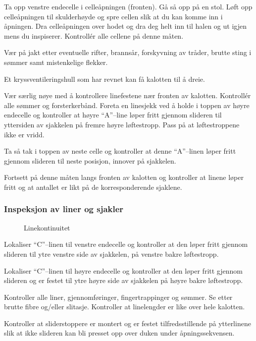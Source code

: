 Ta opp venstre endecelle i celleåpningen (fronten). Gå så opp på en stol. Løft opp celleåpningen til skulderhøyde og spre cellen slik at du kan komme inn i åpningen. Dra celleåpningen over hodet og dra deg helt inn til halen og ut igjen mens du inspiserer. Kontrollér alle cellene på denne måten.

Vær på jakt etter eventuelle rifter, brannsår, forskyvning av tråder, brutte sting i sømmer samt mistenkelige flekker.

Et kryssventileringshull som har revnet kan få kalotten til å dreie.

Vær særlig nøye med å kontrollere linefestene nær fronten av kalotten. Kontrollér alle sømmer og forsterkerbånd. Foreta en linesjekk ved å holde i toppen av høyre endecelle og kontroller at høyre ``A''–line løper fritt gjennom slideren til yttersiden av sjakkelen på fremre høyre løftestropp.
Pass på at løftestroppene ikke er vridd.

Ta så tak i toppen av neste celle og kontroller at denne ``A''–linen løper fritt gjennom slideren til neste posisjon, innover på sjakkelen.

Fortsett på denne måten langs fronten av kalotten og kontroller at linene løper fritt og at antallet er likt på de korresponderende sjaklene.

\subsubsection{Inspeksjon av liner og sjakler}

\begin{figure}
	\caption{Linekontinuitet}
\end{figure}

Lokaliser ``C''–linen til venstre endecelle og kontroller at den løper fritt gjennom slideren til ytre venstre side av sjakkelen, på venstre bakre løftestropp.

Lokaliser ``C''–linen til høyre endecelle og kontroller at den løper fritt gjennom slideren og er festet til ytre høyre side av sjakkelen på høyre bakre løftestropp.

Kontroller alle liner, gjennomføringer, fingertrappinger og sømmer. Se etter brutte fibre og/eller slitasje. Kontroller at linelengder er like over hele kalotten.

Kontroller at sliderstoppere er montert og er festet tilfredsstillende på ytterlinene slik at ikke slideren kan bli presset opp over duken under åpningssekvensen.

